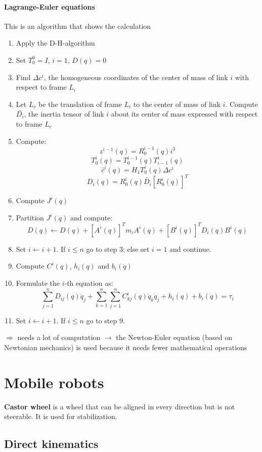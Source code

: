 \documentclass[12pt]{article}
\begin{document}
	\paragraph{Lagrange-Euler equations} This is an algorithm that shows the calculation
	\begin{enumerate}
		\item Apply the D-H-algorithm
		\item Set $T^0_0 = I$, $i = 1$, $D(q) = 0$
		\item Find $\Delta c^i$, the homogeneous coordinates of the center of mass of link $i$ with respect to frame $L_i$
		\item Let $L_c$ be the translation of frame $L_i$ to the center of mass of link $i$. Compute $\bar{D_i}$, the inertia tensor of link $i$ about its center of mass expressed with respect to frame $L_c$
		\item Compute: $$z^{i-1}(q) = R^{i-1}_0(q) i^3$$
		$$T^i_0(q) = T^{i-1}_0(q)T^i_{i-1}(q)$$
		$$\bar{c}^i(q) = H_1 T^i_0(q) \Delta c^i$$
		$$D_i(q) = R^i_0(q) \bar{D}_i [R^i_0(q)]^T$$
		\item Compute $J^i(q)$
		\item Partition $J^i(q)$ and compute: $$D(q) \leftarrow D(q) + [A^i(q)]^T m_i A^i(q) + [B^i(q)]^T D_i(q) B^i(q)$$
		\item Set $i \leftarrow i + 1$. If $i \leq n$ go to step 3; else set $i = 1$ and continue.
		\item Compute $C^i(q)$, $h_i(q)$ and $b_i(\dot{q})$
		\item Formulate the $i$-th equation as:
		$$ \sum_{j=1}^n D_{ij}(q) \ddot{q}_j + \sum_{k=1}^{n} \sum_{j=1}^{n} C^i_{kj}(q) \dot{q}_k \dot{q}_j + h_i(q) + b_i(\dot{q}) = \tau_i $$
		\item Set $i \leftarrow i + 1$. If $i \leq n$ go to step 9.
	\end{enumerate}
	$\Rightarrow$ needs a lot of computation $\rightarrow$ the Newton-Euler equation (based on Newtonian mechanics) is used because it needs fewer mathematical operations
	
	
	\section{Mobile robots}
	\textbf{Castor wheel} is a wheel that can be aligned in every direction but is not steerable. It is used for stabilization.
	\subsection{Direct kinematics}
\end{document}
